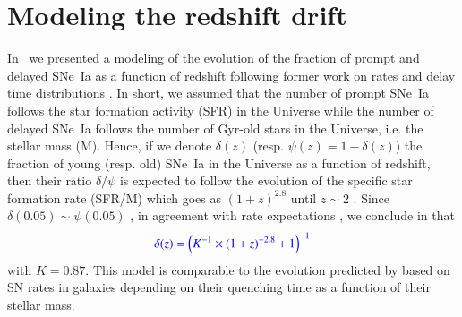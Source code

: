 \documentclass[]{aa} %
\newcommand{\mri}[1]{{\textcolor{red}{#1}}}
\newcommand{\nn}[1]{{\textcolor[rgb]{1, 0.27, 0}{#1}}}
\newcommand{\yc}[1]{{\textcolor{blue}{#1}}}
\begin{document}






\section{Modeling the redshift drift}
\label{sec:modeling}

In~\cite{rigault2018} we presented a modeling of the evolution of the fraction
of prompt and delayed SNe~Ia as a function of redshift following former work on
rates and delay time distributions \citep[e.g.,][]{mannucci2005,
scannapieco2005, sullivan2006, aubourg2008, childress2014, maozmannucci2014}.
In short, we assumed that the number of prompt SNe~Ia follows the star formation
activity \nn{(SFR)} in the Universe while the number of delayed SNe~Ia follows
the number of Gyr-old stars in the Universe, i.e. the stellar mass \nn{(M)}.
Hence, if we denote $\delta(z)$ (resp. $\psi(z) = 1 - \delta(z)$) the fraction of young (resp.
old) SNe~Ia in the Universe as a function of redshift, then their ratio
$\delta/\psi$ is expected to follow the evolution of the specific star formation
rate \nn{(SFR/M)} which goes as $(1+z)^{2.8}$ until $z\sim2$
\citep[e.g.,][]{tasca2015}. Since \nn{$\delta(0.05) \sim \psi(0.05)$}
\citep{rigault2013,rigault2018,wiseman2020}, in agreement with rate expectations
\citep{mannucci2006,rodney2014}, we conclude in
\cite{rigault2018} that
\begin{equation}
    \label{eq:delta}
    \yc{\delta(z) = \left( K^{-1} \times (1+z)^{-2.8} +1 \right)^{-1}}
\end{equation}
with $K=0.87$. This model is comparable to the evolution predicted by
\cite{childress2014} based on SN rates in galaxies depending on their quenching
time as a function of their stellar mass.
\end{document}
